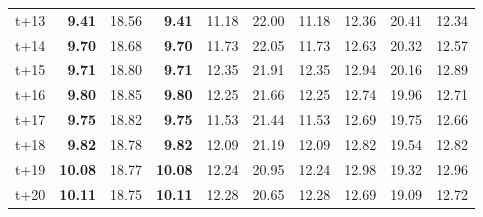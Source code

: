 \begin{table}[H]
\begin{tabular}{lrrrrrrrrr}
t+13  & \textbf{9.41}  & 18.56  & \textbf{9.41}  & 11.18  & 22.00  & 11.18  & 12.36  & 20.41  & 12.34  \\
t+14  & \textbf{9.70}  & 18.68  & \textbf{9.70}  & 11.73  & 22.05  & 11.73  & 12.63  & 20.32  & 12.57  \\
t+15  & \textbf{9.71}  & 18.80  & \textbf{9.71}  & 12.35  & 21.91  & 12.35  & 12.94  & 20.16  & 12.89  \\
t+16  & \textbf{9.80}  & 18.85  & \textbf{9.80}  & 12.25  & 21.66  & 12.25  & 12.74  & 19.96  & 12.71  \\
t+17  & \textbf{9.75}  & 18.82  & \textbf{9.75}  & 11.53  & 21.44  & 11.53  & 12.69  & 19.75  & 12.66  \\
t+18  & \textbf{9.82}  & 18.78  & \textbf{9.82}  & 12.09  & 21.19  & 12.09  & 12.82  & 19.54  & 12.82  \\
t+19  & \textbf{10.08}  & 18.77  & \textbf{10.08}  & 12.24  & 20.95  & 12.24  & 12.98  & 19.32  & 12.96  \\
t+20  & \textbf{10.11}  & 18.75  & \textbf{10.11}  & 12.28  & 20.65  & 12.28  & 12.69  & 19.09  & 12.72  \\

\bottomrule
\end{tabular}
\end{table}
